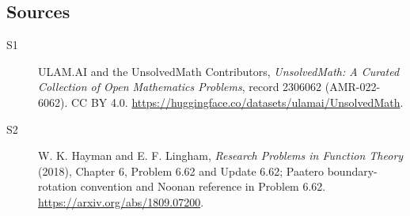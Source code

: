 \documentclass[11pt]{article}
\begin{document}
\subsection{Sources}
\begin{description}
\item[\hypertarget{source:2306062:1}{S1}] ULAM.AI and the UnsolvedMath Contributors, \emph{UnsolvedMath: A Curated Collection of Open Mathematics Problems}, record 2306062 (AMR-022-6062). CC BY 4.0. \url{https://huggingface.co/datasets/ulamai/UnsolvedMath}.
\item[\hypertarget{source:2306062:2}{S2}] W. K. Hayman and E. F. Lingham, \emph{Research Problems in Function Theory} (2018), Chapter 6, Problem 6.62 and Update 6.62; Paatero boundary-rotation convention and Noonan reference in Problem 6.62. \url{https://arxiv.org/abs/1809.07200}.
\end{description}
\label{end:2306062}
\end{document}
